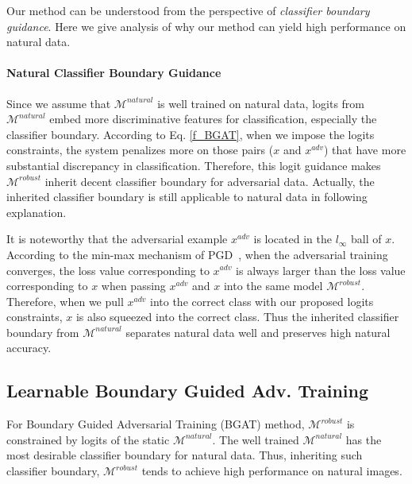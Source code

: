 \documentclass[10pt,twocolumn,letterpaper]{article}
\begin{document}
Our method can be understood from the perspective of \textit{classifier boundary guidance}. Here we give analysis of why our method can yield high performance on natural data.

\paragraph{Natural Classifier Boundary Guidance} 
Since we assume that $\mathcal{M}^{natural}$ is well trained on natural data, logits from $\mathcal{M}^{natural}$ embed more discriminative features for classification, especially the classifier boundary. According to Eq. \eqref{f_BGAT}, when we impose the logits constraints, the system penalizes more on those pairs ($x$ and $x^{adv}$) that have more substantial discrepancy in classification. Therefore, this logit guidance makes $\mathcal{M}^{robust}$ inherit decent classifier boundary for adversarial data. Actually, the inherited classifier boundary is still applicable to natural data in following explanation.

It is noteworthy that the adversarial example $x^{adv}$ is located in the $l_{\infty}$ ball of $x$. According to the min-max mechanism of PGD~\cite{DBLP:conf/iclr/MadryMSTV18}, when the adversarial training converges, the loss value corresponding to $x^{adv}$ is always larger than the loss value corresponding to $x$ when passing $x^{adv}$ and $x$ into the same model $\mathcal{M}^{robust}$. Therefore, when we pull $x^{adv}$ into the correct class with our proposed logits constraints, $x$ is also squeezed into the correct class. Thus the inherited classifier boundary from $\mathcal{M}^{natural}$ separates natural data well and preserves high natural accuracy. 

\subsection{Learnable Boundary Guided Adv. Training}
\label{sec_LBGAT}
For Boundary Guided Adversarial Training (BGAT) method, $\mathcal{M}^{robust}$ is constrained by logits of the static $\mathcal{M}^{natural}$. The well trained $\mathcal{M}^{natural}$ has the most desirable classifier boundary for natural data. Thus, inheriting such classifier boundary, $\mathcal{M}^{robust}$ tends to achieve high performance on natural images. 
\end{document}
